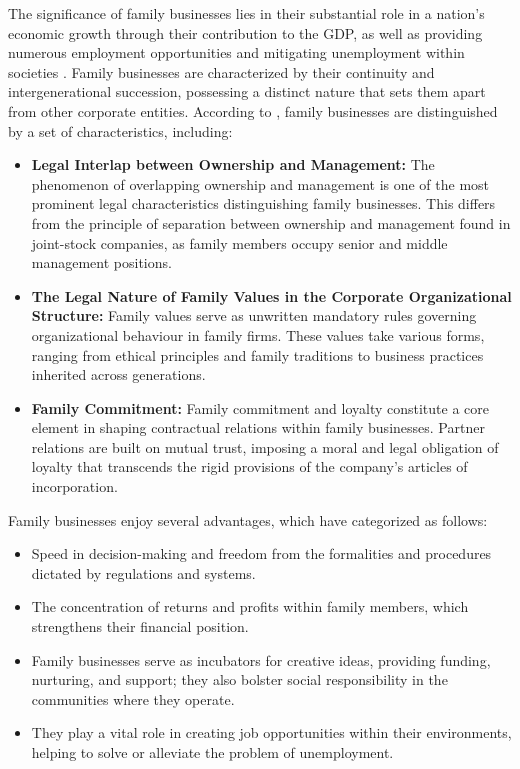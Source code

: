 \documentclass[10pt]{NSP1}
\begin{document}
	The significance of family businesses lies in their substantial role in a nation's economic growth through their contribution to the GDP, as well as providing numerous employment opportunities and mitigating unemployment within societies \cite{Fatiha2020, Hamdi2019}. Family businesses are characterized by their continuity and intergenerational succession, possessing a distinct nature that sets them apart from other corporate entities. According to \cite{AlSiyabi2025}, family businesses are distinguished by a set of characteristics, including:
	\begin{itemize}
		\item \textbf{Legal Interlap between Ownership and Management:} The phenomenon of overlapping ownership and management is one of the most prominent legal characteristics distinguishing family businesses. This differs from the principle of separation between ownership and management found in joint-stock companies, as family members occupy senior and middle management positions.
		\item \textbf{The Legal Nature of Family Values in the Corporate Organizational Structure:} Family values serve as unwritten mandatory rules governing organizational behaviour in family firms. These values take various forms, ranging from ethical principles and family traditions to business practices inherited across generations.
		\item \textbf{Family Commitment:} Family commitment and loyalty constitute a core element in shaping contractual relations within family businesses. Partner relations are built on mutual trust, imposing a moral and legal obligation of loyalty that transcends the rigid provisions of the company's articles of incorporation.
	\end{itemize}
	
	Family businesses enjoy several advantages, which \cite{Darwish2025, Salman2011} have categorized as follows:
	\begin{itemize}
		\item Speed in decision-making and freedom from the formalities and procedures dictated by regulations and systems.
		\item The concentration of returns and profits within family members, which strengthens their financial position.
		\item Family businesses serve as incubators for creative ideas, providing funding, nurturing, and support; they also bolster social responsibility in the communities where they operate.
		\item They play a vital role in creating job opportunities within their environments, helping to solve or alleviate the problem of unemployment.
	\end{itemize}
	
\end{document}
